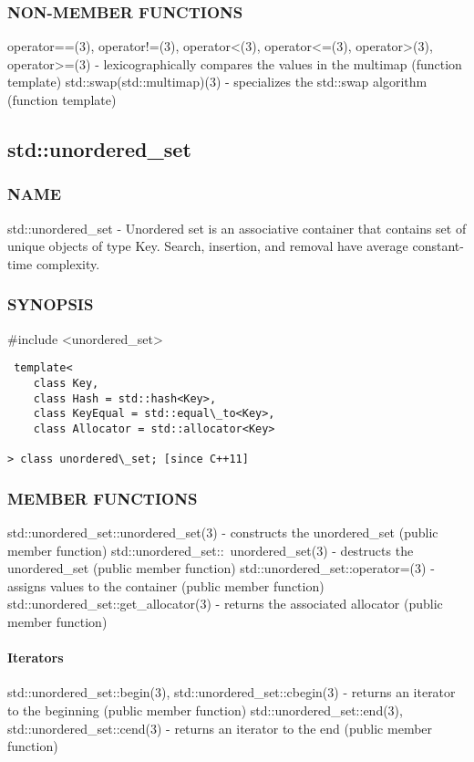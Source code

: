 \subsubsection{NON-MEMBER FUNCTIONS}
operator==(3), operator!=(3), operator<(3), operator<=(3), operator>(3), operator>=(3) - lexicographically compares the values in the multimap   (function template)
std::swap(std::multimap)(3) - specializes the std::swap algorithm   (function template)


\subsection{std::unordered\_set}

\subsubsection{NAME}
std::unordered\_set - Unordered set is an associative container that contains set of unique objects of type Key. Search, insertion, and removal have average constant-time complexity.

\subsubsection{SYNOPSIS}
\#include <unordered\_set>

\begin{lstlisting}
 template<
    class Key,
    class Hash = std::hash<Key>,
    class KeyEqual = std::equal\_to<Key>,
    class Allocator = std::allocator<Key>

> class unordered\_set; [since C++11]
\end{lstlisting}

\subsubsection{MEMBER FUNCTIONS}
std::unordered\_set::unordered\_set(3) - constructs the unordered\_set  (public member function)
std::unordered\_set::~unordered\_set(3) - destructs the unordered\_set  (public member function)
std::unordered\_set::operator=(3) - assigns values to the container   (public member function)
std::unordered\_set::get\_allocator(3) - returns the associated allocator   (public member function)
\paragraph{Iterators}
std::unordered\_set::begin(3), std::unordered\_set::cbegin(3) - returns an iterator to the beginning   (public member function)
std::unordered\_set::end(3), std::unordered\_set::cend(3) - returns an iterator to the end   (public member function)
